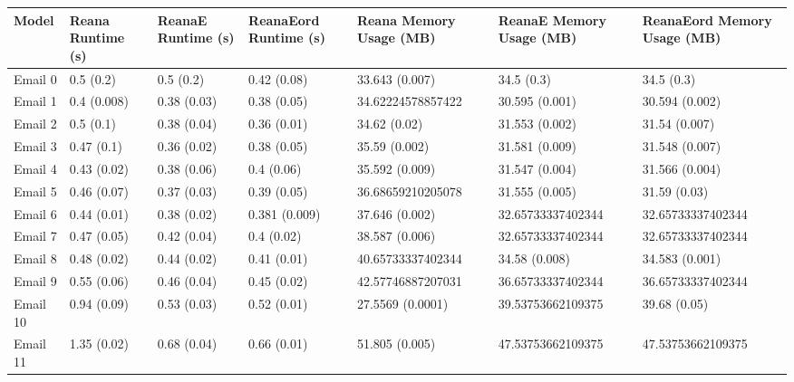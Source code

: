 \begin{tabular}{lllllll}
\toprule
   Model & Reana Runtime (s) & ReanaE Runtime (s) & ReanaEord Runtime (s) & Reana Memory Usage (MB) & ReanaE Memory Usage (MB) & ReanaEord Memory Usage (MB) \\
\midrule
 Email 0 &         0.5 (0.2) &          0.5 (0.2) &           0.42 (0.08) &          33.643 (0.007) &               34.5 (0.3) &                  34.5 (0.3) \\
 Email 1 &       0.4 (0.008) &        0.38 (0.03) &           0.38 (0.05) &       34.62224578857422 &           30.595 (0.001) &              30.594 (0.002) \\
 Email 2 &         0.5 (0.1) &        0.38 (0.04) &           0.36 (0.01) &            34.62 (0.02) &           31.553 (0.002) &               31.54 (0.007) \\
 Email 3 &        0.47 (0.1) &        0.36 (0.02) &           0.38 (0.05) &           35.59 (0.002) &           31.581 (0.009) &              31.548 (0.007) \\
 Email 4 &       0.43 (0.02) &        0.38 (0.06) &            0.4 (0.06) &          35.592 (0.009) &           31.547 (0.004) &              31.566 (0.004) \\
 Email 5 &       0.46 (0.07) &        0.37 (0.03) &           0.39 (0.05) &       36.68659210205078 &           31.555 (0.005) &                31.59 (0.03) \\
 Email 6 &       0.44 (0.01) &        0.38 (0.02) &         0.381 (0.009) &          37.646 (0.002) &        32.65733337402344 &           32.65733337402344 \\
 Email 7 &       0.47 (0.05) &        0.42 (0.04) &            0.4 (0.02) &          38.587 (0.006) &        32.65733337402344 &           32.65733337402344 \\
 Email 8 &       0.48 (0.02) &        0.44 (0.02) &           0.41 (0.01) &       40.65733337402344 &            34.58 (0.008) &              34.583 (0.001) \\
 Email 9 &       0.55 (0.06) &        0.46 (0.04) &           0.45 (0.02) &       42.57746887207031 &        36.65733337402344 &           36.65733337402344 \\
Email 10 &       0.94 (0.09) &        0.53 (0.03) &           0.52 (0.01) &        27.5569 (0.0001) &        39.53753662109375 &                39.68 (0.05) \\
Email 11 &       1.35 (0.02) &        0.68 (0.04) &           0.66 (0.01) &          51.805 (0.005) &        47.53753662109375 &           47.53753662109375 \\

\end{tabular}
